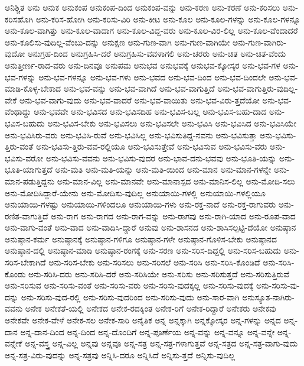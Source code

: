 {ಅನಿಶ್ಚಿತ
ಅನು
ಅನುಕ
ಅನುಕಂಪ
ಅನುಕಂಪ-ದಿಂದ
ಅನುಕಂಪ-ವನ್ನು
ಅನು-ಕರಣ
ಅನು-ಕರಣೆ
ಅನು-ಕರಿಸಲು
ಅನು-ಕರಿಸಹೊಗಿ
ಅನು-ಕರಿಸ-ಹೋಗಿ
ಅನು-ಕರಿಸು-ವಿರಿ
ಅನು-ಕೀಟ
ಅನು-ಕೂಲ
ಅನು-ಕೂಲ-ಗಳನ್ನು
ಅನು-ಕೂಲ-ಗಳನ್ನೂ
ಅನು-ಕೂಲ-ವಾಗಿತ್ತು
ಅನು-ಕೂಲ-ವಾದಾಗ
ಅನು-ಕೂಲ-ವಿದ್ದ-ವರು
ಅನು-ಕೂಲ-ವಿರ-ಲಿಲ್ಲ
ಅನು-ಕೂಲ-ವೆಂದಾದರೆ
ಅನು-ಕೂಲಿಸು-ವುದಿಲ್ಲ-ವೆಂಬು-ದನ್ನು
ಅನುಕ್ಷಣ
ಅನು-ಗುಣ-ವಾಗಿ
ಅನು-ಗುಣ-ವಾಗಿಯೇ
ಅನು-ಗುಣ-ವಾಗಿರು-ವುದೋ
ಅನುಗ್ರಹ-ದಿಂದ
ಅನುಗ್ರಹಿಸಿ-ದರೆ
ಅನುಗ್ರಹಿಸು-ವವಳಾಗಲಿ
ಅನು-ಚರರು
ಅನು-ಚಿತ
ಅನು-ಚಿತ-ವೆಂದು
ಅನುತ್ತೀರ್ಣ-ರಾದ-ವರು
ಅನು-ದಿನವೂ
ಅನುಪಮ
ಅನುಭವ
ಅನುಭವಕ್ಕೆ
ಅನುಭವ-ಕ್ಕೋಸ್ಕರ
ಅನು-ಭವ-ಗಳ
ಅನು-ಭವ-ಗಳನ್ನು
ಅನು-ಭವ-ಗಳನ್ನೂ
ಅನು-ಭವ-ಗಳು
ಅನು-ಭವದ
ಅನು-ಭವ-ದಿಂದ
ಅನು-ಭವ-ದಿಂದಲೇ
ಅನು-ಭವ-ಮಾಡಿ-ಕೊಳ್ಳ-ಬೇಕಾದ
ಅನು-ಭವ-ವನ್ನು
ಅನು-ಭವ-ವಾಗಿದೆ
ಅನು-ಭವ-ವಾಗುತ್ತಿದೆ
ಅನು-ಭವ-ವಾಗುತ್ತಿರು-ವುದಿಲ್ಲ-ವೇಕೆ
ಅನು-ಭವ-ವಾಗು-ವುದು
ಅನು-ಭವ-ವಾದರೆ
ಅನು-ಭವ-ವಾಯಿತು
ಅನು-ಭವ-ವಿರು-ತ್ತದೆಯೋ
ಅನು-ಭವ-ವೆಂಥಾದ್ದು
ಅನು-ಭವವೇ
ಅನು-ಭವಿಸದ
ಅನು-ಭವಿಸದಿಹ
ಅನು-ಭವಿಸ-ಬಲ್ಲ
ಅನು-ಭವಿಸ-ಬಹು-ದಾದ
ಅನು-ಭವಿಸ-ಬಹುದು
ಅನು-ಭವಿಸ-ಬೇಕು
ಅನು-ಭವಿಸಲು
ಅನು-ಭವಿಸಲೇ
ಅನು-ಭವಿಸಿ
ಅನು-ಭವಿಸಿದ
ಅನು-ಭವಿಸಿಯೇ
ಅನು-ಭವಿಸಿರು-ವರು
ಅನು-ಭವಿಸಿ-ರುವೆ
ಅನು-ಭವಿಸಿಲ್ಲ
ಅನು-ಭವಿಸುತಿದ್ದ-ನವನು
ಅನು-ಭವಿಸುತ್ತಾ
ಅನು-ಭವಿಸು-ತ್ತಿರು-ವಂತೆ
ಅನು-ಭವಿಸು-ತ್ತಿರು-ವವ-ರಲ್ಲಿಯೂ
ಅನು-ಭವಿಸುತ್ತೇವೆ
ಅನು-ಭವಿಸುವ
ಅನು-ಭವಿಸು-ವರು
ಅನು-ಭವಿಸು-ವರೋ
ಅನು-ಭವಿಸು-ವವನು
ಅನು-ಭವಿಸು-ವುದರ
ಅನು-ಭಾವ-ದನು-ಭವವು
ಅನು-ಭೂತಿ-ಯನ್ನು
ಅನು-ಭೂತಿ-ಯಾಗುತ್ತದೆ
ಅನು-ಮತಿ
ಅನು-ಮತಿ-ಯನ್ನು
ಅನು-ಮತಿ-ಯಿಂದ
ಅನು-ಮಾನ
ಅನು-ಮಾನ-ಗಳನ್ನೇ
ಅನು-ಮಾನ-ಪಡುತ್ತಿದ್ದನು
ಅನು-ಮಾನ-ವಿಲ್ಲ
ಅನು-ಮಾನವೇ
ಅನು-ಮಾನಾಸ್ಪದ
ಅನು-ಮಾನಿಸ-ಲಿಲ್ಲ
ಅನು-ಮೋದಿ-ಸಲು
ಅನು-ಮೋದಿಸಿದ್ದಾರೆ-ಯೇನು
ಅನು-ಮೋದಿಸು-ವುದಿಲ್ಲ
ಅನುಯಾಯಿ-ಗಳಲ್ಲಿ
ಅನುಯಾಯಿ-ಗಳಲ್ಲಿಯೂ
ಅನುಯಾಯಿ-ಗಳಷ್ಟು
ಅನುಯಾಯಿ-ಗಳಿಂದಲೂ
ಅನುಯಾಯಿ-ಗಳು
ಅನು-ರಕ್ತ-ನಾದೆ
ಅನು-ರಕ್ತ-ರಾಗುವರು
ಅನು-ರಣಿತ-ವಾಗುತ್ತಿದೆ
ಅನು-ರಾಗ
ಅನು-ರಾಗದ
ಅನು-ರಾಗ-ವನ್ನು
ಅನು-ರಾಗವು
ಅನು-ರಾಗಿ-ಯಾದ
ಅನು-ರೂಪ-ವಾದ
ಅನು-ವಾಗು-ವಂತೆ
ಅನು-ವಾದ
ಅನು-ವಾದಿಸಿ-ದ್ದಾರೆ
ಅನುವು
ಅನು-ಶಾಸನದ
ಅನು-ಶಾಸಿಸಲ್ಪಟ್ಟಿ-ದೆಯೋ
ಅನುಷ್ಠಾನ
ಅನುಷ್ಠಾನ-ಕರ್ಮ
ಅನುಷ್ಠಾನಕ್ಕೆ
ಅನುಷ್ಠಾನ-ಗಳಿಗೂ
ಅನುಷ್ಠಾನ-ಗಳೇ
ಅನುಷ್ಠಾನ-ಗೊಳಿಸ-ಬೇಕು
ಅನುಷ್ಠಾನದ
ಅನುಷ್ಠಾನ-ದಲ್ಲಿ
ಅನುಷ್ಠಾನ-ಮಾಡಿ
ಅನುಷ್ಠಾನ-ರಂಗಕ್ಕೆ
ಅನು-ಸರಣ
ಅನು-ಸರಿಸ-ದಿದ್ದಲ್ಲಿ
ಅನು-ಸರಿಸ-ಬಹುದು
ಅನು-ಸರಿಸ-ಬೇಕಾಗಿದೆ
ಅನು-ಸರಿಸ-ಬೇಕು
ಅನು-ಸರಿಸಲು
ಅನು-ಸರಿಸಲೆ
ಅನು-ಸರಿಸಿ
ಅನು-ಸರಿಸಿ-ಕೊಂಡಿದೆ
ಅನು-ಸರಿಸಿ-ಕೊಂಡು
ಅನು-ಸರಿಸಿ-ದರು
ಅನು-ಸರಿಸಿ-ದರೆ
ಅನು-ಸರಿಸಿಯೇ
ಅನು-ಸರಿಸು
ಅನು-ಸರಿಸುತ್ತದೆ
ಅನು-ಸರಿಸುತ್ತಿರುವೆ
ಅನು-ಸರಿಸುವ
ಅನು-ಸರಿಸು-ವಂತೆ
ಅನು-ಸರಿಸು-ವರು
ಅನು-ಸರಿಸು-ವುದಕ್ಕಲ್ಲ
ಅನು-ಸರಿಸು-ವುದಕ್ಕೆ
ಅನು-ಸರಿಸು-ವು-ದನ್ನು
ಅನು-ಸರಿಸು-ವುದ-ರಲ್ಲಿ
ಅನು-ಸರಿಸು-ವುದರಿಂದ
ಅನು-ಸರಿಸು-ವುದು
ಅನು-ಸಾರ-ವಾಗಿ
ಅನುಸ್ಯೂತ-ನಾಗಿರು-ವವನು
ಅನೇಕ
ಅನೇಕತೆ-ಯಲ್ಲಿ
ಅನೇಕದ
ಅನೇಕ-ರದಕ್ಕಿಂತ
ಅನೇಕ-ರಿಗೆ
ಅನೇಕ-ರಿದ್ದಾರೆ
ಅನೇಕರು
ಅನೇಕವು
ಅನೇಕವೇ
ಅನೇಕ-ವೇಳೆ
ಅನೇಕ-ಸಲ
ಅನೇಕ-ಸಾರಿ
ಅನೈತಿಕ
ಅನ್ನ
ಅನ್ನಕ್ಕಾಗಿ
ಅನ್ನಕ್ಕೋಸ್ಕರ
ಅನ್ನ-ಗಳನ್ನು
ಅನ್ನದ
ಅನ್ನ-ದಾನ
ಅನ್ನ-ದಾನ-ದಿಂದ
ಅನ್ನ-ದಿಂದ
ಅನ್ನ-ದೊಂದಿಗೆ
ಅನ್ನ-ಪೂರ್ಣೆಯ
ಅನ್ನ-ವನ್ನು
ಅನ್ನ-ವನ್ನೂ
ಅನ್ನ-ವನ್ನೇ
ಅನ್ನ-ವನ್ನೇಕೆ
ಅನ್ನ-ವಸ್ತ್ರ
ಅನ್ನ-ವಿಲ್ಲ
ಅನ್ನವು
ಅನ್ನವೂ
ಅನ್ನ-ಸತ್ರ
ಅನ್ನ-ಸತ್ರ-ಗಳಾಗುತ್ತವೆ
ಅನ್ನ-ಸತ್ರದ
ಅನ್ನ-ಸತ್ರ-ವಾಗು-ವುದು
ಅನ್ನ-ಸತ್ರ-ವಿರು-ವುದನ್ನು
ಅನ್ನ-ಸತ್ರವು
ಅನ್ನಿಸಿ-ದರೂ
ಅನ್ನಿಸಿದೆ
ಅನ್ನಿಸು-ತ್ತದೆ
ಅನ್ನಿಸು-ವುದಿಲ್ಲ
}
